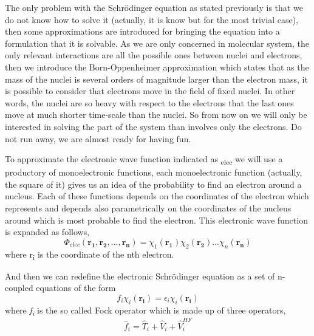 \documentclass{tmr}
\begin{document}
\par The only problem with the Schr\"odinger equation as stated previously
is that we do not know how to solve it 
(actually, it is know but for the most trivial case),
then some approximations are introduced for bringing the equation into 
a formulation that it is solvable. As we are only concerned
in molecular system, the only relevant interactions are all the possible ones
between nuclei and electrons, then we
introduce the Born-Oppenheimer approximation which states that as the mass of the nuclei is several 
orders of magnitude larger than the electron mass, it is possible to consider that electrons move in the 
field of fixed nuclei. In other words, the nuclei are so heavy with respect to the electrons that the last ones move 
at much shorter time-scale than the nuclei. So from now on we will only be interested in solving 
the part of the system than involves only the electrons. Do not run away, we are almost ready for having fun.

\par To approximate the electronic wave function indicated as \textPhi\textsubscript{elec}
we will use a productory of monoelectronic functions, each monoelectronic
function (actually, the square of it) gives us an idea of the probability to find an electron around 
a nucleus. Each of these functions depends on the coordinates of the electron which represents and depends also 
parametrically on the coordinates of the nucleus around which is most probable to 
find the electron. This electronic wave function is expanded as follows, 
\begin{equation}\label{8}
 \Phi_{elec}(\mathbf{r_{1}},\mathbf{r_{2}},...,\mathbf{r_{n}}) =
 \chi_{1}(\mathbf{r_{1}})\chi_{2}(\mathbf{r_{2}})...\chi_{n}(\mathbf{r_{n}})
 \end{equation}                                                                                                                
where r\textsubscript{i} is the coordinate of the nth electron.

And then we can redefine the electronic Schr\"odinger equation as a set of n-coupled equations of 
the form 
\begin{equation}\label{9}
 f_{i}\chi_{i}(\mathbf{r_{i}}) = \epsilon_{i}\chi_{i}(\mathbf{r_{i}})
\end{equation}
where \textit{f\textsubscript{i}} is the so called Fock operator which is made up
of three operators, 
\begin{equation}\label{10}
\hat f_{i} = \hat T_{i}  + \hat V_{i} + \hat V^{HF}_{i} 
\end{equation}
\end{document}
